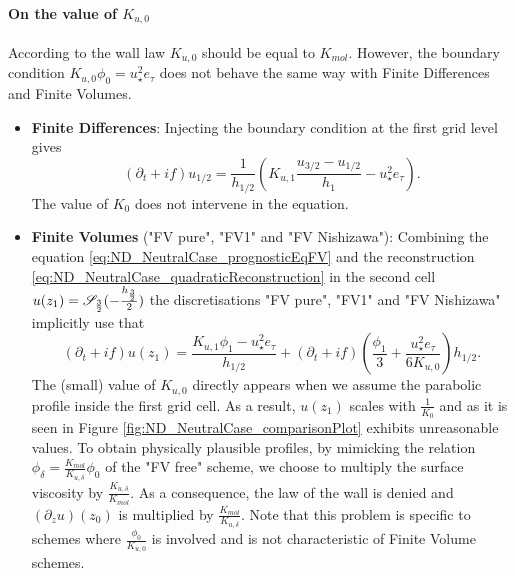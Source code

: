 \paragraph{On the value of $K_{u,0}$}
\label{sec:ND_StratifiedCase_viscosity0_FVpure}
According to the wall law $K_{u,0}$ should be equal to $K_{mol}$.
However, the boundary condition $K_{u,0} \phi_0 = u_\star^2 e_\tau$
does not behave the same way with Finite Differences and Finite
Volumes.
\begin{itemize}
	\item \textbf{Finite Differences}:
Injecting the boundary condition at the first grid level gives
		\begin{equation}
			(\partial_t+if) u_{1/2} = \frac{1}{h_{1/2}}
			\left(K_{u,1}\frac{u_{3/2} - u_{1/2}}{h_1}
			 - u_\star^2 e_\tau \right).
		\end{equation}
The value of $K_0$ does not intervene in the equation.
\item \textbf{Finite Volumes} ("FV pure", "FV1" and "FV Nishizawa"):
Combining the equation \eqref{eq:ND_NeutralCase_prognosticEqFV}
and the reconstruction
\eqref{eq:ND_NeutralCase_quadraticReconstruction} in the second cell
$u(z_1) = {\cal S}_{\frac{3}{2}}(-\frac{h_\frac{3}{2}}{2})$
the discretisations "FV pure", "FV1" and "FV Nishizawa"
implicitly use that
\begin{equation}
		(\partial_t+if) u(z_1) =
		\frac{K_{u,1} \phi_1 - u_\star^2 e_\tau} {h_{1/2}}
		+ (\partial_t+if)\left(\frac{\phi_1}{3}
		+ \frac{u_\star^2 e_\tau}{6 K_{u,0}}\right)h_{1/2}.
\end{equation}
The (small) value of $K_{u,0}$ directly appears when we assume the
parabolic profile inside the first grid cell.
As a result, $u(z_1)$ scales with $\frac{1}{K_0}$ and
as it is seen in Figure \ref{fig:ND_NeutralCase_comparisonPlot}
exhibits unreasonable values.
To obtain physically plausible profiles,
by mimicking the relation
$\phi_{\delta} = \frac{K_{mol}}{K_{u,\delta}}\phi_0$ of the
"FV free" scheme, we choose to multiply the surface
viscosity by $\frac{K_{u,\delta}}{K_{mol}}$.
As a consequence, the law of the wall is denied and
$(\partial_z u)(z_0)$ is multiplied
by $\frac{K_{mol}}{K_{u,\delta}}$.
Note that this problem is specific to schemes where
$\frac{\phi_0}{K_{u,0}}$ is involved and
is not characteristic of Finite Volume schemes.
\end{itemize}


